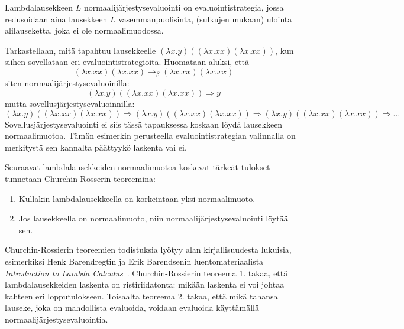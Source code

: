 \begin{alg}[normaalijärjestysevaluointi]
Lambdalausekkeen $L$ normaalijärjestysevaluointi on evaluointistrategia, jossa redusoidaan aina lausekkeen $L$ vasemmanpuolisinta, (sulkujen mukaan) ulointa alilauseketta, joka ei ole normaalimuodossa.
\end{alg}

\begin{esim}
Tarkastellaan, mitä tapahtuu lausekkeelle $(\lambda x . y) ((\lambda x . xx) (\lambda x . xx))$, kun siihen sovellataan eri evaluointistrategioita. Huomataan aluksi, että  
\[ (\lambda x . xx) (\lambda x . xx) \rightarrow_{\beta} (\lambda x . xx) (\lambda x . xx) \]
siten normaalijärjestysevaluoinilla:
\[ (\lambda x . y) ((\lambda x . xx) (\lambda x . xx)) \Longrightarrow y \]
mutta sovellusjärjestysevaluoinnilla:
\[  (\lambda x . y) ((\lambda x . xx) (\lambda x . xx)) \Longrightarrow
	(\lambda x . y) ((\lambda x . xx) (\lambda x . xx)) \Longrightarrow
	(\lambda x . y) ((\lambda x . xx) (\lambda x . xx)) \Longrightarrow \ldots \]
Sovellusjärjestysevaluointi ei siis tässä tapauksessa koskaan löydä lausekkeen normaalimuotoa. Tämän esimerkin perusteella evaluointistrategian valinnalla on merkitystä sen kannalta päättyykö laskenta vai ei. 
\end{esim}
\par
Seuraavat lambdalausekkeiden normaalimuotoa koskevat tärkeät tulokset tunnetaan Churchin-Rosserin teoreemina: 
\begin{lau}
\begin{enumerate} $ $\newline
	\item Kullakin lambdalausekkeella on korkeintaan yksi normaalimuoto.
	\item Jos lausekkeella on normaalimuoto, niin normaalijärjestysevaluointi löytää sen. 
\end{enumerate}
\end{lau}
\par
Churchin-Rossierin teoreemien todistuksia lyötyy alan kirjallisuudesta lukuisia, esimerkiksi Henk Barendregtin ja Erik Barendsenin luentomateriaalista \textit{Introduction to Lambda Calculus}~\cite[s.~23--30]{HBEB2000}. Churchin-Rossierin teoreema 1. takaa, että lambdalausekkeiden laskenta on ristiriidatonta: mikään laskenta ei voi johtaa kahteen eri lopputulokseen. Toisaalta teoreema 2. takaa, että mikä tahansa lauseke, joka on mahdollista evaluoida, voidaan evaluoida käyttämällä normaalijärjestysevaluointia.
